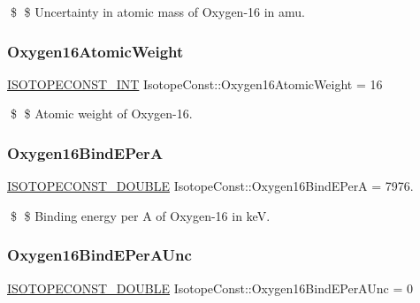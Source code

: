 \$ \$ Uncertainty in atomic mass of Oxygen-\/16 in amu. \mbox{\label{group___isotope_const-_oxygen-_o16_ga7a5a0b6e4dc7e242f6d1768268997026}} 
\subsubsection{\texorpdfstring{Oxygen16\+Atomic\+Weight}{Oxygen16AtomicWeight}}
{\footnotesize\ttfamily \mbox{\hyperlink{group___isotope_const-_macros_ga5f18360b3e99483a35c32d789e62621c}{I\+S\+O\+T\+O\+P\+E\+C\+O\+N\+S\+T\+\_\+\+I\+NT}} Isotope\+Const\+::\+Oxygen16\+Atomic\+Weight = 16}

\$ \$ Atomic weight of Oxygen-\/16. \mbox{\label{group___isotope_const-_oxygen-_o16_ga1032c12268c77d61cbf1b809ee7cb5f0}} 
\subsubsection{\texorpdfstring{Oxygen16\+Bind\+E\+PerA}{Oxygen16BindEPerA}}
{\footnotesize\ttfamily \mbox{\hyperlink{group___isotope_const-_macros_ga8f45a7272ce02c0b4c65c44636ed719a}{I\+S\+O\+T\+O\+P\+E\+C\+O\+N\+S\+T\+\_\+\+D\+O\+U\+B\+LE}} Isotope\+Const\+::\+Oxygen16\+Bind\+E\+PerA = 7976.}

\$ \$ Binding energy per A of Oxygen-\/16 in keV. \mbox{\label{group___isotope_const-_oxygen-_o16_ga1894c6d74beaa59181ab46bd4916294f}} 
\subsubsection{\texorpdfstring{Oxygen16\+Bind\+E\+Per\+A\+Unc}{Oxygen16BindEPerAUnc}}
{\footnotesize\ttfamily \mbox{\hyperlink{group___isotope_const-_macros_ga8f45a7272ce02c0b4c65c44636ed719a}{I\+S\+O\+T\+O\+P\+E\+C\+O\+N\+S\+T\+\_\+\+D\+O\+U\+B\+LE}} Isotope\+Const\+::\+Oxygen16\+Bind\+E\+Per\+A\+Unc = 0}

